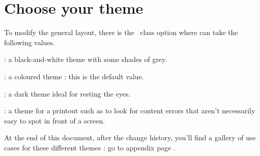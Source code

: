 \documentclass{tutodoc}
\begin{document}
\section{Choose your theme}

To modify the general layout, there is the \thisproj\ class option  where  can take the following values.

\begin{tasks}[style=itemize]
    \task {}:
          a black-and-white theme with some shades of grey.

    \task {}:
          a coloured theme : this is the default value.

    \task {}:
          a dark theme ideal for resting the eyes.

    \task {}:
          a theme for a printout such as to look for content errors that aren't necessarily easy to spot in front of a screen.
\end{tasks}


\begin{tdocnote}
    At the end of this document, after the change history, you'll find a gallery of use cases for these different themes : go to appendix page \pageref{tutodoc-theme-gallery}.
\end{tdocnote}
\end{document}

